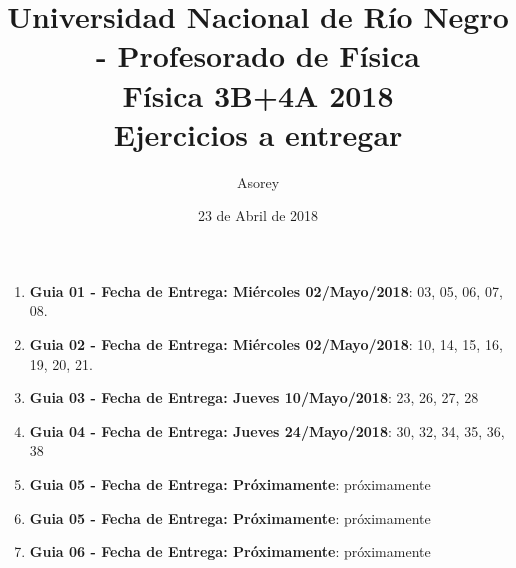 \documentclass[a4paper,12pt]{article}
\begin{document}
\title{
{\normalsize{Universidad Nacional de Río Negro - Profesorado de Física}}\\
Física 3B+4A  2018 \\ Ejercicios a entregar}
\author{Asorey}
\date{23 de Abril de 2018}
\maketitle

\begin{enumerate}
	\item {\bf{Guia 01 - Fecha de Entrega: Miércoles 02/Mayo/2018}}: 03, 05, 06, 07, 08. 
	\item {\bf{Guia 02 - Fecha de Entrega: Miércoles 02/Mayo/2018}}: 10, 14, 15, 16, 19, 20, 21. 
	\item {\bf{Guia 03 - Fecha de Entrega: Jueves 10/Mayo/2018}}: 23, 26, 27, 28 
	\item {\bf{Guia 04 - Fecha de Entrega: Jueves 24/Mayo/2018}}: 30, 32, 34, 35, 36, 38
	\item {\bf{Guia 05 - Fecha de Entrega: Próximamente}}: próximamente
	\item {\bf{Guia 05 - Fecha de Entrega: Próximamente}}: próximamente
	\item {\bf{Guia 06 - Fecha de Entrega: Próximamente}}: próximamente


\end{enumerate}
\end{document}
